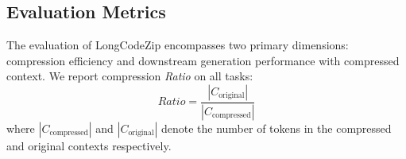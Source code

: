 \documentclass[10pt,conference]{IEEEtran}
\newcommand{\todoc}[2]{{\textcolor{#1}{\textbf{[#2]}}}}
\newcommand{\shi}[1]{\todoc{orange}{Shi: #1}}
\newcommand{\approach}{{LongCodeZip}\xspace} %
\begin{document}





\subsection{Evaluation Metrics}
The evaluation of \approach encompasses two primary dimensions: compression efficiency and downstream generation performance with compressed context.
We report compression \textit{Ratio} on all tasks:
\begin{equation}
\textit{Ratio} = \frac{|C_{\text{original}}|}{|C_{\text{compressed}}|}
\end{equation}
where $|C_{\text{compressed}}|$ and $|C_{\text{original}}|$ denote the number of tokens in the compressed and original contexts respectively.
\end{document}

